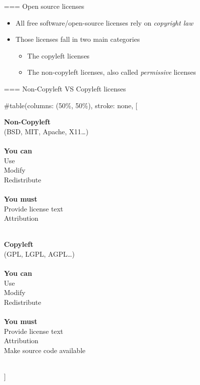 === {Open source licenses}
  \begin{itemize}
  \item All free software/open-source licenses rely on {\em
      copyright law}
  \item Those licenses fall in two main categories
    \begin{itemize}
    \item The copyleft licenses
    \item The non-copyleft licenses, also called {\em permissive}
      licenses
    \end{itemize}
  \end{itemize}


=== {Non-Copyleft VS Copyleft licenses}
  
#table(columns: (50\%, 50\%), stroke: none,
[
      \begin{center}
        {\bf Non-Copyleft}\\
        (BSD, MIT, Apache, X11\dots)\\
      {\ }\\
      {\bf You can}\\
      Use\\
      Modify\\
      Redistribute\\
      {\ }\\
      {\bf You must}\\
      Provide license text \\
      Attribution \\
      {\ }
      \end{center}

      \begin{center}
        {\bf Copyleft} \\
        (GPL, LGPL, AGPL\dots)\\
      {\ }\\
      {\bf You can}\\
      Use\\
      Modify\\
      Redistribute\\
      {\ }\\
      {\bf You must}\\
      Provide license text \\
      Attribution \\
      Make source code available
       \end{center}

  \\]


